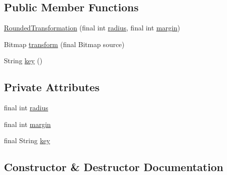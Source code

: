 \subsection*{Public Member Functions}
\begin{DoxyCompactItemize}
\item 
\hyperlink{classorg_1_1buildmlearn_1_1videocollection_1_1RoundedTransformation_a18accdda2176a956d6c006f47a184e97}{Rounded\+Transformation} (final int \hyperlink{classorg_1_1buildmlearn_1_1videocollection_1_1RoundedTransformation_ae37c42b021c0190916477fc85d67b430}{radius}, final int \hyperlink{classorg_1_1buildmlearn_1_1videocollection_1_1RoundedTransformation_aa9e3271dd36c7955f95c56e57f7f174d}{margin})
\item 
Bitmap \hyperlink{classorg_1_1buildmlearn_1_1videocollection_1_1RoundedTransformation_a3ea503a525daa21c85b4fa37f9b4862c}{transform} (final Bitmap source)
\item 
String \hyperlink{classorg_1_1buildmlearn_1_1videocollection_1_1RoundedTransformation_a26bf565ccc9ab88596f9266b935a447d}{key} ()
\end{DoxyCompactItemize}
\subsection*{Private Attributes}
\begin{DoxyCompactItemize}
\item 
final int \hyperlink{classorg_1_1buildmlearn_1_1videocollection_1_1RoundedTransformation_ae37c42b021c0190916477fc85d67b430}{radius}
\item 
final int \hyperlink{classorg_1_1buildmlearn_1_1videocollection_1_1RoundedTransformation_aa9e3271dd36c7955f95c56e57f7f174d}{margin}
\item 
final String \hyperlink{classorg_1_1buildmlearn_1_1videocollection_1_1RoundedTransformation_af620b5967073c7bcc0d72266f74b6509}{key}
\end{DoxyCompactItemize}


\subsection{Constructor \& Destructor Documentation}
